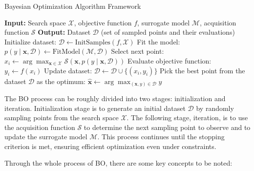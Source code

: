 \documentclass[a4paper,fleqn,numbers,sort&compress]{cas-sc}
\begin{document}
\begin{algorithm}[H]
    \caption{Bayesian Optimization Algorithm Framework}
    \label{alg:SMBO}
    \begin{algorithmic}[1]
        \STATE \textbf{Input:} Search space $\boldsymbol{\mathcal{X}}$, objective function $f$, surrogate model $\boldsymbol{\mathcal{M}}$, acquisition function $\boldsymbol{\mathcal{S}}$
        \STATE \textbf{Output:} Dataset $\boldsymbol{\mathcal{D}}$ (set of sampled points and their evaluations)
        \STATE Initialize dataset: $\boldsymbol{\mathcal{D}} \gets \text{InitSamples}(f, \boldsymbol{\mathcal{X}})$
            \STATE Fit the model: $p(y \mid \boldsymbol{x}, \boldsymbol{\mathcal{D}}) \gets \text{FitModel}(\boldsymbol{\mathcal{M}}, \boldsymbol{\mathcal{D}})$
            \STATE Select next point: $x_i \gets \arg \max_{\boldsymbol{x} \in \boldsymbol{\mathcal{X}}} \boldsymbol{\mathcal{S}}(\boldsymbol{x}, p(y \mid \boldsymbol{x}, \boldsymbol{\mathcal{D}}))$
            \STATE Evaluate objective function: $y_i \gets f(x_i)$
            \STATE Update dataset: $\boldsymbol{\mathcal{D}} \gets \boldsymbol{\mathcal{D}} \cup \{(x_i, y_i)\}$
        \ENDFOR
        \STATE Pick the best point from the dataset $\boldsymbol{\mathcal{D}}$ as the optimum: $\boldsymbol{\hat{x}} \gets \arg \max_{(\boldsymbol{x}, y) \in \boldsymbol{\mathcal{D}}} y$
    \end{algorithmic}
\end{algorithm}

The BO process can be roughly divided into two stages: initialization and iteration. Initialization stage is to generate an initial dataset $\boldsymbol{\mathcal{D}}$ by randomly sampling points from the search space $\boldsymbol{\mathcal{X}}$. The following stage, iteration, is to use the acquisition function $\boldsymbol{\mathcal{S}}$ to determine the next sampling point to observe and to update the surrogate model $\boldsymbol{\mathcal{M}}$. This process continues until the stopping criterion is met, ensuring efficient optimization even under constraints.

Through the whole process of BO, there are some key concepts to be noted:
\end{document}
